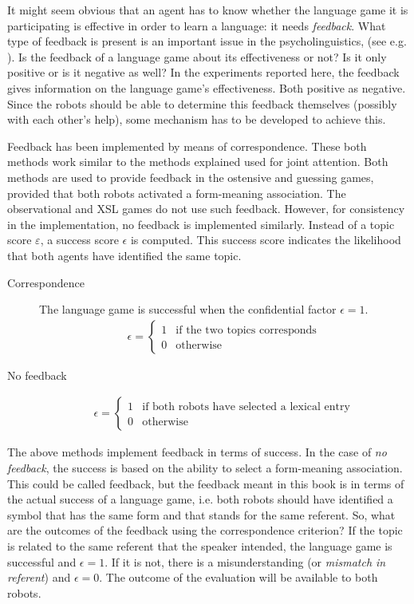 It might seem obvious that an agent has to know whether the language game it is participating is effective in order to learn a language: it needs {\em feedback}. What type of feedback is present is an important issue in the psycholinguistics, (see e.g. \citealt{bowerman:1988}). Is the feedback of a language game about its effectiveness or not? Is it only positive or is it negative as well? In the experiments reported here, the feedback gives information on the language game's effectiveness. Both positive as negative. Since the robots should be able to determine this feedback themselves (possibly with each other's help), some mechanism has to be developed to achieve this.


Feedback has been implemented by means of correspondence. These both methods work similar to the methods explained used for joint attention. Both methods are used to provide feedback in the ostensive and guessing games, provided that both robots activated a form-meaning association.  The observational and XSL games do not use such feedback. However, for consistency in the implementation, no feedback is implemented similarly. Instead of a topic score $\varepsilon$, a success score $\epsilon$ is computed. This success score indicates the likelihood that both agents have identified the same topic.

\begin{description}
\item[Correspondence]
The language game is successful when the confidential factor $\epsilon=1$.
\begin{eqnarray}\epsilon = \left \{ \begin{array}{rl}
1 & \mbox{if the two topics corresponds}\\
0 & \mbox{otherwise}
\end{array}
\right.
\end{eqnarray}

\item[No feedback]
\begin{eqnarray}
\epsilon = \left \{ \begin{array}{rl}
1 & \mbox{if both robots have selected a lexical entry}\\
0 & \mbox{otherwise}
\end{array}
\right.
\end{eqnarray}
\end{description}


The above methods implement feedback in terms of success. In the case of {\em no feedback}, the success is based on the ability to select a form-meaning association. This could be called feedback, but the feedback meant in this book is in terms of the actual success of a language game, i.e. both robots should have identified a symbol that has the same form and that stands for the same referent. So, what are the outcomes of the feedback using the correspondence criterion? If the topic is related to the same referent that the speaker intended, the language game is successful and $\epsilon=1$. If it is not, there is a misunderstanding (or {\em mismatch in referent}) and $\epsilon=0$. The outcome of the evaluation will be available to both robots.

